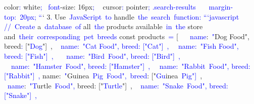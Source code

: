 \documentclass{article}
\begin{document}
\begin{tcolorbox}[colframe=black,colback=white]
{{}  color\textcolor{blue}{:} white\textcolor{blue}{;
} \textcolor{blue}{~font}-size: 16px\textcolor{blue}{;
}\textcolor{blue}{~} cursor\textcolor{blue}{:} pointer\textcolor{blue}{;
}}
\textcolor{blue}{.search}\textcolor{blue}{-results}\textcolor{blue}{~{
}\textcolor{blue}{~}\textcolor{blue}{~margin}\textcolor{blue}{-top}:\textcolor{blue}{~}20px\textcolor{blue}{;
}}
\textcolor{blue}{``}`
3\textcolor{blue}{.} Use\textcolor{blue}{~JavaScript}\textcolor{blue}{~to} handle\textcolor{blue}{~the}\textcolor{blue}{~search}\textcolor{blue}{~function}\textcolor{blue}{:
}\textcolor{blue}{```}\textcolor{blue}{javascript}\textcolor{blue}{
}\textcolor{blue}{//}\textcolor{blue}{~Create} a\textcolor{blue}{~database}\textcolor{blue}{~of} all\textcolor{blue}{~the} products available\textcolor{blue}{~in}\textcolor{blue}{~the} store and\textcolor{blue}{~their}\textcolor{blue}{~corresponding}\textcolor{blue}{~pet}\textcolor{blue}{~breeds}\textcolor{blue}{
}const products\textcolor{blue}{~=} [
\textcolor{blue}{~} {\textcolor{blue}{~name}:\textcolor{blue}{~"}Dog Food", breed\textcolor{blue}{:} ["\textcolor{blue}{Dog}"]\textcolor{blue}{~},
} \textcolor{blue}{~{} name:\textcolor{blue}{~"}Cat Food", breed: ["\textcolor{blue}{Cat}"]\textcolor{blue}{~},
} \textcolor{blue}{~{}\textcolor{blue}{~name}:\textcolor{blue}{~"}Fish Food", breed: ["\textcolor{blue}{Fish}"]\textcolor{blue}{~},
}\textcolor{blue}{~}\textcolor{blue}{~{}\textcolor{blue}{~name}:\textcolor{blue}{~"}\textcolor{blue}{Bird}\textcolor{blue}{~Food}\textcolor{blue}{",} breed: ["\textcolor{blue}{Bird}"]\textcolor{blue}{~},
} \textcolor{blue}{~{}\textcolor{blue}{~name}:\textcolor{blue}{~"}\textcolor{blue}{Ham}ster\textcolor{blue}{~Food}\textcolor{blue}{",} breed: ["\textcolor{blue}{Ham}\textcolor{blue}{ster}"]\textcolor{blue}{~},
} \textcolor{blue}{~{}\textcolor{blue}{~name}:\textcolor{blue}{~"}R\textcolor{blue}{abbit}\textcolor{blue}{~Food}\textcolor{blue}{",} breed: ["\textcolor{blue}{R}\textcolor{blue}{abbit}\textcolor{blue}{"]}\textcolor{blue}{~},
}  { name:\textcolor{blue}{~"}Guinea\textcolor{blue}{~Pig}\textcolor{blue}{~Food}\textcolor{blue}{",}\textcolor{blue}{~breed}: ["\textcolor{blue}{Gu}inea\textcolor{blue}{~Pig}\textcolor{blue}{"]}\textcolor{blue}{~},
}  {\textcolor{blue}{~name}:\textcolor{blue}{~"}\textcolor{blue}{T}urtle\textcolor{blue}{~Food}\textcolor{blue}{",} breed: ["\textcolor{blue}{T}\textcolor{blue}{urtle}"]\textcolor{blue}{~},
} \textcolor{blue}{~{} name:\textcolor{blue}{~"}\textcolor{blue}{Snake}\textcolor{blue}{~Food}\textcolor{blue}{",} breed: ["\textcolor{blue}{Snake}\textcolor{blue}{"]}\textcolor{blue}{~},
}
\end{tcolorbox}
\end{document}
